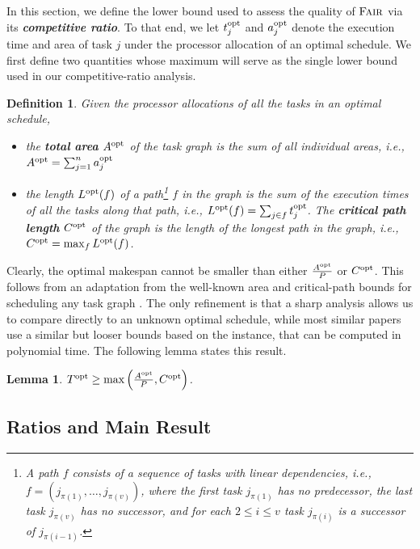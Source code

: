 \documentclass{article}
\newtheorem{lemma}{Lemma}
\newtheorem{definition}{Definition}
\newcommand\fair{\textsc{Fair}\xspace}
\newcommand\opt{\textnormal{opt}\xspace}
\begin{document}
In this section, we define the lower bound used to assess the quality of $\fair$ via its \textbf{\emph{competitive ratio}}. To that end, we let $t_j^{\opt}$ and $a_j^{\opt}$ denote the execution time and area of task $j$ under the processor allocation of an optimal schedule.
We first define two quantities whose maximum will serve as the single lower bound used in our competitive-ratio analysis.

\begin{definition}
Given the processor allocations of all the tasks in an optimal schedule,
\begin{itemize}
\item the \textbf{\emph{total area}} $A^{\opt}$ of the task graph is the sum of all individual areas, i.e., $A^{\opt} = \sum_{j=1}^{n} a_j^{\opt}$
  
  \item the length $L^{\opt}(f)$ of a path\footnote{A path $f$ consists of a sequence of tasks with linear dependencies, i.e., $f = (j_{\pi(1)},\dots,j_{\pi(v)})$, where the first task $j_{\pi(1)}$ has no predecessor, the last task $j_{\pi(v)}$ has no successor, and for each $2 \le i \le v$ task $j_{\pi(i)}$ is a successor of $j_{\pi(i-1)}$.} $f$ in the graph is the sum of the execution times of all the tasks along that path, i.e., $L^{\opt}(f) = \sum_{j\in f}t_j^{\opt}$. The \textbf{\emph{critical path length}} $C^{\opt}$ of the graph is the length of the longest path in the graph, i.e., $C^{\opt} = \max_{f} L^{\opt}(f)$.
\end{itemize}
\end{definition}

Clearly, the optimal makespan cannot be smaller than either $\frac{A^{\opt}}{P}$ or $C^{\opt}$. This follows from an adaptation from the well-known area and critical-path bounds for scheduling any task graph \cite{Graham69}. The only refinement is that a sharp analysis allows us to compare directly to an unknown optimal schedule, while most similar papers use a similar but looser bounds based on the instance, that can be computed in polynomial time.
The following lemma states this result.
\begin{lemma}\label{lem.lower}
$T^{\opt} \ge \max \left(\frac{A^{\opt}}{P}, C^{\opt} \right)$.
\end{lemma}

\subsection{Ratios and Main Result}
\label{sec.ratios}
\end{document}
